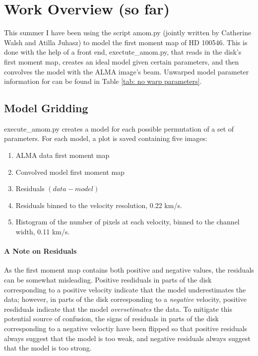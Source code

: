 \documentclass[a4paper]{tufte-handout}
\begin{document}
\hrulefill





\hrulefill


\section{Work Overview (so far)}
\label{sec:Work Overview}

This summer I have been using the script amom.py (jointly written by Catherine Walsh and Atilla Juhasz) to model the first moment map of HD 100546. This is done with the help of a front end, exectute\_amom.py, that reads in the disk's first moment map, creates an ideal model given certain parameters, and then convolves the model with the ALMA image's beam. Unwarped model parameter information for can be found in Table \ref{tab: no warp parameters}.


\subsection{Model Gridding}
execute\_amom.py creates a model for each possible permutation of a set of parameters. For each model, a plot is saved containing five images:
\begin{enumerate}
  \item ALMA data first moment map
  \item Convolved model first moment map
  \item Residuals $(data-model)$
  \item Residuals binned to the velocity resolution, 0.22 km/s.
  \item Histogram of the number of pixels at each velocity, binned to the channel width, 0.11 km/s.
\end{enumerate}

\paragraph{A Note on Residuals}
As the first moment map contains both positive and negative values, the residuals can be somewhat misleading. Positive resdiduals in parts of the disk corresponding to a positive velocity indicate that the model underestimates the data; however, in parts of the disk corresponding to a \textit{negative} velocity, positive resdiduals indicate that the model \textit{oversetimates} the data. To mitigate this potential source of confusion, the signs of residuals in parts of the disk corresponding to a negative veloctiy have been flipped so that positive residuals always suggest that the model is too weak, and negative residuals always suggest that the model is too strong.
\end{document}
